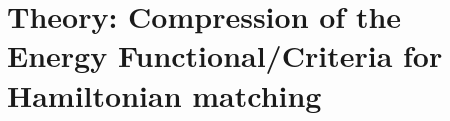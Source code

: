 \documentclass[prl,12pt,onecolumn,nofootinbib,notitlepage,english,superscriptaddress]{revtex4-1}
\newcommand{\HJC}[1]{{\color{RED}{\bf HJC: #1}}}
\begin{document}
\section{Theory: Compression of the Energy Functional/Criteria for Hamiltonian matching}
\HJC{Lucas handling this section......Look at theory.tex}

%
%
%
\end{document}
